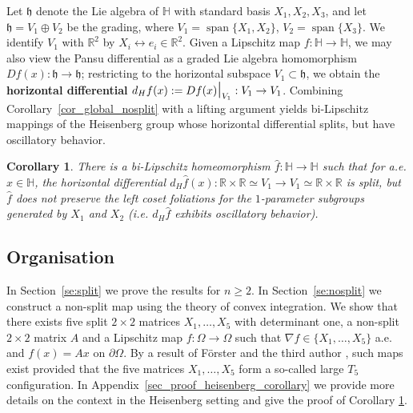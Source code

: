\documentclass[titlepage]{amsart}
\numberwithin{equation}{section}
\theoremstyle{plain}
\newtheorem{corollary}[equation]{Corollary}
\theoremstyle{definition}
\theoremstyle{remark}
\newcommand{\fh}{\mathfrak{h}}
\renewcommand{\H}{\mathbb{H}}
\newcommand{\R}{\mathbb{R}}
\newcommand{\ra}{\rightarrow}
\newcommand{\restr}{\mbox{\Large \(|\)\normalsize}}
\newcommand{\Span}{\operatorname{span}}
\newcommand{\g}{\nabla }
\begin{document}
Let $\fh$ denote the Lie algebra of $\H$ with standard basis $X_1,X_2,X_3$, and let $\fh=V_1\oplus V_2$ be the grading, where $V_1=\Span\{X_1,X_2\}$, $V_2=\Span\{X_3\}$.  We identify $V_1$ with $\R^2$ by $X_i\leftrightarrow e_i\in \R^2$.   Given a Lipschitz map $f:\H\ra\H$, we may also view the Pansu differential as a graded Lie algebra homomorphism $Df(x):\fh\ra \fh$; restricting to the horizontal subspace $V_1\subset\fh$, we obtain the {\bf horizontal differential} $d_Hf(x):=Df(x)\restr_{V_1}:V_1\ra V_1$.   Combining Corollary~\ref{cor_global_nosplit} with a lifting argument  yields bi-Lipschitz mappings of the Heisenberg group whose horizontal differential splits, but have oscillatory behavior.

\begin{corollary}
\label{cor_heisenberg_example} 
There is a bi-Lipschitz homeomorphism $\hat f:\H\ra \H$  such that for a.e. $x\in\H$, the horizontal differential $d_H\hat f(x):\R\times\R\simeq V_1\ra V_1\simeq \R\times \R$ is split, but $\hat f$ does not preserve the left coset foliations for the $1$-parameter subgroups generated by $X_1$ and $X_2$ (i.e. $d_H\hat f$ exhibits oscillatory behavior). 
\end{corollary}

\bigskip


\subsection{Organisation} In Section~\ref{se:split} we  prove the results for $n \ge 2$. 
In Section~\ref{se:nosplit}  we construct a non-split map using the theory of convex integration.
We show that there exists five  split $2 \times 2$  matrices $X_1, \ldots, X_5$ with determinant one,
a non-split $2 \times 2$ matrix $A$ and a Lipschitz map $f: \Omega \to \Omega$ such that
$\g f \in \{X_1, \ldots, X_5\}$ a.e. and $f(x) = Ax$ on $\partial \Omega$. 
By a result of F\"orster and the third author \cite{szekelyhidi_forster18},  such maps exist provided
that the five matrices $X_1, \ldots, X_5$ form a so-called large $T_5$ configuration. 
In Appendix~\ref{sec_proof_heisenberg_corollary} we provide more details on the context in the Heisenberg setting and give the proof of Corollary \ref{cor_heisenberg_example}.
\end{document}
